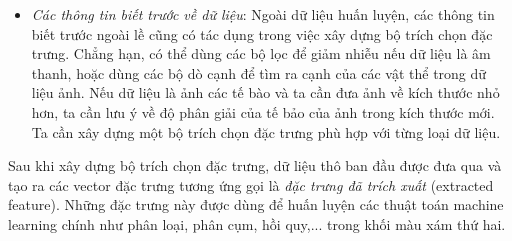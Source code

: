 \begin{itemize}
\item \textit{Các thông tin biết trước về dữ liệu}: Ngoài dữ liệu huấn luyện, các thông tin biết trước ngoài lề cũng có tác dụng trong việc xây dựng bộ trích chọn đặc trưng. Chẳng hạn, có thể dùng các bộ lọc để giảm nhiễu nếu dữ liệu là âm thanh, hoặc dùng các bộ dò cạnh để tìm ra cạnh của các vật thể trong dữ liệu ảnh. Nếu dữ liệu là ảnh các tế bào và ta cần đưa ảnh về kích thước nhỏ hơn, ta cần lưu ý về độ phân giải của tế bảo của ảnh trong kích thước mới. Ta cần xây dựng một bộ trích chọn đặc trưng phù hợp với từng loại dữ liệu.
\end{itemize}

Sau khi xây dựng bộ trích chọn đặc trưng, dữ liệu thô ban đầu được đưa qua và
tạo ra các vector đặc trưng tương ứng gọi là \textit{đặc trưng đã trích
xuất} ({extracted feature}). Những đặc trưng này được dùng để huấn luyện
các thuật toán machine learning chính như phân loại, phân cụm, hồi quy,... trong
khối màu xám thứ hai.





